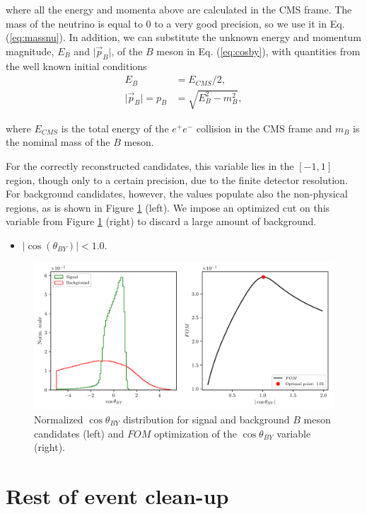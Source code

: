 \documentclass[  headings=standardclasses,
  headings=big,oneside,a4paper,openany,12pt]{scrbook}
\begin{document}
where all the energy and momenta above are calculated in the CMS frame. The mass of the neutrino is equal to 0 to a very good precision, so we use it in Eq. (\ref{eq:massnu}). In addition, we can substitute the unknown energy and momentum magnitude, $E_B$ and $\vert \vec{p}_B \vert$, of the $B$ meson in Eq. (\ref{eq:cosby}), with quantities from the well known initial conditions
\begin{align}
E_B &= E_{CMS} / 2,\\
\vert \vec{p}_B \vert = p_B &= \sqrt{E_B^2 - m_B^2},
\end{align} 

where $E_{CMS}$ is the total energy of the $e^+e^-$ collision in the CMS frame and $m_B$ is the nominal mass of the $B$ meson. 

For the correctly reconstructed candidates, this variable lies in the $[-1,1]$ region, though only to a certain precision, due to the finite detector resolution. For background candidates, however, the values populate also the non-physical regions, as is shown in Figure \ref{fig:cosby} (left). We impose an optimized cut on this variable from Figure \ref{fig:cosby} (right) to discard a large amount of background.
\begin{itemize}
\item $\vert \cos \left(\theta_{BY}\right) \vert < 1.0$.
\end{itemize}

\begin{figure}[H]
\centering
\captionsetup{width=.8\linewidth}
\includegraphics[width=\linewidth]{fig/cosBY}
\caption{Normalized $\cos \theta_{BY}$ distribution for signal and background $B$ meson candidates (left) and $FOM$ optimization of the $\cos \theta_{BY}$ variable (right).}
\label{fig:cosby}
\end{figure}

\section{Rest of event clean-up}
\label{sc:shortroe}
\end{document}
